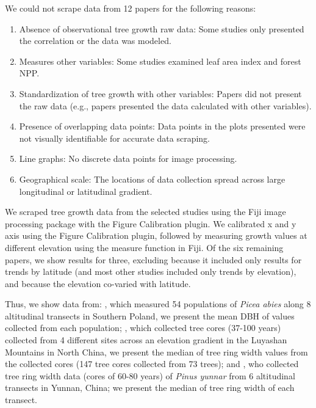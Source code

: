 \documentclass[11pt]{article}
\begin{document}
We could not scrape data from 12 papers for the following reasons: 
\begin{enumerate}
\item Absence of observational tree growth raw data: Some studies only presented the correlation or the data was modeled. 
\item  Measures other variables: Some studies examined leaf area index and forest NPP. 
\item  Standardization of tree growth with other variables: Papers did not present the raw data (e.g., papers presented the data calculated with other variables).
\item  Presence of overlapping data points: Data points in the plots presented were not visually identifiable for accurate data scraping.
\item Line graphs: No discrete data points for image processing. 
\item Geographical scale: The locations of data collection spread across large longitudinal or latitudinal gradient. 
\end{enumerate}

We scraped tree growth data from the selected studies using the Fiji image processing package with the Figure Calibration plugin. We calibrated x and y axis using the Figure Calibration plugin, followed by measuring growth values at different elevation using the measure function in Fiji. Of the six remaining papers, we show results for three, excluding \citet{huang2010radial} because it included only results for trends by latitude (and most other studies included only trends by elevation), and \citet{cavin2017highest,zhu2018spatial} because the elevation co-varied with latitude. %

Thus, we show data from: \citet{oleksyn1998growth}, which measured 54 populations of  \emph{Picea abies} along 8 altitudinal transects in Southern Poland, we present the mean DBH of values collected from each population; \citet{wang2017climatic}, which collected  tree cores (37-100 years) collected from 4 different sites across an elevation gradient in the Luyashan Mountains in North China, we present the median of tree ring width values from the collected cores (147 tree cores collected from 73 trees); and \citet{zhou2022altitudinal}, who collected tree ring width data (cores of 60-80 years) of \emph{Pinus yunnar} from 6 altitudinal transects in Yunnan, China; we present the median of tree ring width of each transect.
\end{document}
